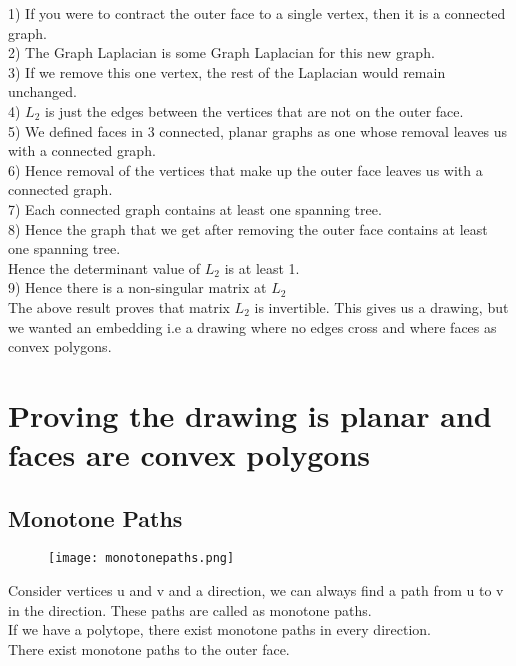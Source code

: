 \documentclass{article}
\begin{document}
    1) If you were to contract the outer face to a single vertex, then it is a connected graph.\\
    2) The Graph Laplacian is some Graph Laplacian for this new graph.\\
    3) If we remove this one vertex, the rest of the Laplacian would remain unchanged.\\
    4) $L_2$ is just the edges between the vertices that are not on the outer face.\\
    5) We defined faces in 3 connected, planar graphs as one whose removal leaves us with a connected graph.\\
    6) Hence removal of the vertices that make up the outer face leaves us with a connected graph.\\
    7) Each connected graph contains at least one spanning tree.\\
    8) Hence the graph that we get after removing the outer face contains at least one spanning tree.\\
    Hence the determinant value of ${L_2}$ is at least 1.\\
    9) Hence there is a non-singular matrix at ${L_2}$\\
    
    The above result proves that matrix ${L_2}$ is invertible. This gives us a drawing, but we wanted an embedding i.e a drawing where no edges cross and where faces as convex polygons.
    
    \section{Proving the drawing is planar and faces are convex polygons}
    \subsection{Monotone Paths}
    
    \begin{figure}[H]
            \centering
            \texttt{[image: monotonepaths.png]}
    \end{figure}
    
    
    Consider vertices u and v and a direction, we can always find a path from u to v in the direction. These paths are called as monotone paths. \\
    If we have a polytope, there exist monotone paths in every direction.\\
    There exist monotone paths to the outer face.\\
    
\end{document}
